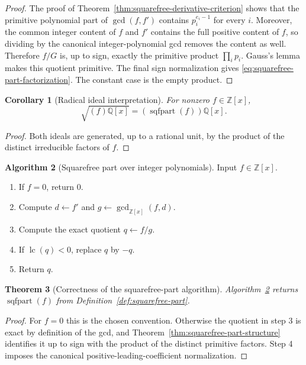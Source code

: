 \documentclass[11pt]{book}
\newtheorem{theorem}{Theorem}[section]
\newtheorem{corollary}[theorem]{Corollary}
\theoremstyle{definition}
\newtheorem{algorithm}[theorem]{Algorithm}
\newcommand{\ZZ}{\mathbb Z}
\begin{document}
\begin{proof}
The proof of Theorem~\ref{thm:squarefree-derivative-criterion} shows that the
primitive polynomial part of $\gcd(f,f')$ contains $p_i^{e_i-1}$ for every
$i$.  Moreover, the common integer content of $f$ and $f'$ contains the full
positive content of $f$, so dividing by the canonical integer-polynomial gcd
removes the content as well.  Therefore $f/G$ is, up to sign, exactly the
primitive product $\prod_i p_i$.  Gauss's lemma makes this quotient primitive.
The final sign normalization gives
\eqref{eq:squarefree-part-factorization}.  The constant case is the empty
product.
\end{proof}

\begin{corollary}[Radical ideal interpretation]
For nonzero $f\in\ZZ[x]$,
\[
 \sqrt{(f)\mathbb Q[x]}
 =(\operatorname{sqfpart}(f))\mathbb Q[x].
\]
\end{corollary}

\begin{proof}
Both ideals are generated, up to a rational unit, by the product of the
distinct irreducible factors of $f$.
\end{proof}

\begin{algorithm}[Squarefree part over integer polynomials]\label{alg:squarefree-part}
Input $f\in\ZZ[x]$.
\begin{enumerate}
 \item If $f=0$, return $0$.
 \item Compute $d\leftarrow f'$ and $g\leftarrow\gcd_{\ZZ[x]}(f,d)$.
 \item Compute the exact quotient $q\leftarrow f/g$.
 \item If $\operatorname{lc}(q)<0$, replace $q$ by $-q$.
 \item Return $q$.
\end{enumerate}
\end{algorithm}

\begin{theorem}[Correctness of the squarefree-part algorithm]
Algorithm~\ref{alg:squarefree-part} returns
$\operatorname{sqfpart}(f)$ from Definition~\ref{def:squarefree-part}.
\end{theorem}

\begin{proof}
For $f=0$ this is the chosen convention.  Otherwise the quotient in step 3 is
exact by definition of the gcd, and Theorem~\ref{thm:squarefree-part-structure}
identifies it up to sign with the product of the distinct primitive factors.
Step 4 imposes the canonical positive-leading-coefficient normalization.
\end{proof}
\end{document}
